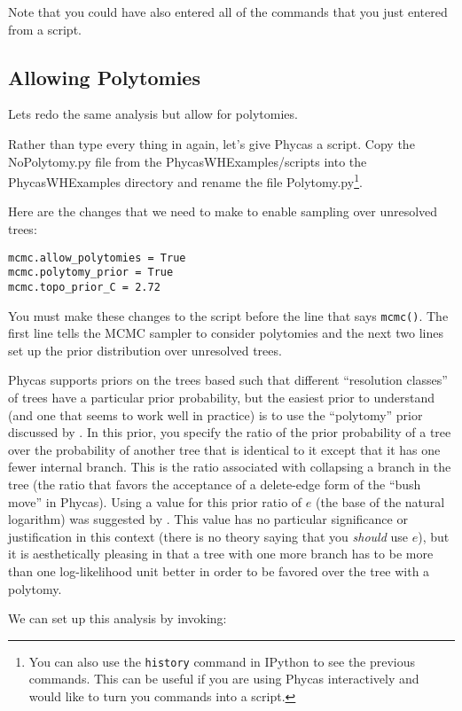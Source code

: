 \documentclass{article}
\newcommand{\cmd}[1]{\texttt{#1}\xspace}
\newcommand{\phycas}{Phycas\xspace}
\newcommand{\localfile}[1]{\textsf{#1}\xspace}
\begin{document}
Note that you could have also entered all of the commands that you just entered from a script. 

\subsection{Allowing Polytomies}
Lets redo the same analysis but allow for polytomies.

Rather than type every thing in again, let's give \phycas a script.
Copy the \localfile{NoPolytomy.py} file from the \localfile{PhycasWHExamples/scripts} 
into the \localfile{PhycasWHExamples} directory  and rename the file \localfile{Polytomy.py}\footnote{You can also use the \cmd{history} command in IPython to see the previous commands. This can be useful if you are using \phycas interactively and would
like to turn you commands into a script.}.

Here are the changes that we need to make to enable sampling over unresolved trees:
\begin{verbatim}
mcmc.allow_polytomies = True
mcmc.polytomy_prior = True
mcmc.topo_prior_C = 2.72
\end{verbatim}
You must make these changes to the script before the line that says \cmd{mcmc()}.
The first line tells the MCMC sampler to consider polytomies and the next  two lines
set up the prior distribution over unresolved trees.

\phycas supports priors on the trees based such that different ``resolution classes'' of trees have a particular prior probability, but the easiest prior to understand (and one that seems to work well in practice) is to use the ``polytomy'' prior discussed by \citet{LewisHH2005}.
In this prior, you specify the ratio of the prior probability of a tree over the probability of another tree that is identical to it except  that it has one fewer internal branch.
This is the ratio associated with collapsing a branch in the tree (the ratio that favors the 
acceptance of a delete-edge form of the ``bush move'' in \phycas).
Using a value for this prior ratio of $e$ (the base of the natural logarithm) was 
suggested by \citet{LewisHH2005}.
This value has no particular significance or justification in this
context (there is no theory saying that you {\em should} use $e$),
but it is aesthetically pleasing in that a tree with one more
branch has to be more than one log-likelihood unit better in
order to be favored over the tree with a polytomy.

We can set up this analysis by invoking:
\end{document}
